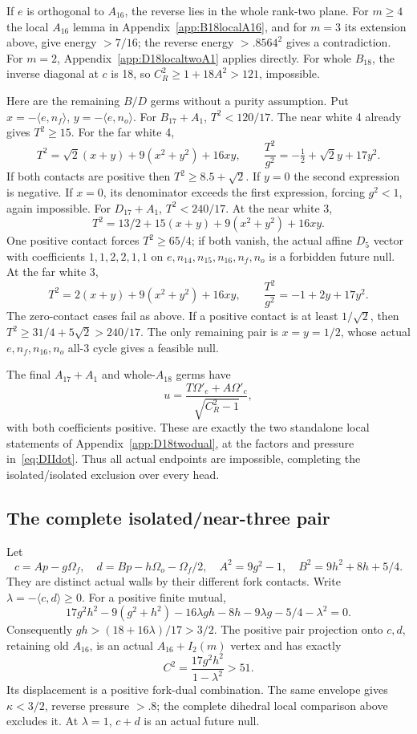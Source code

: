 \documentclass[11pt]{article}
\theoremstyle{definition}
\theoremstyle{remark}
\newcommand{\ip}[2]{\langle #1,#2\rangle}
\begin{document}
If \(e\) is orthogonal to \(A_{16}\), the reverse lies in the whole
rank-two plane.  For \(m\ge4\) the local \(A_{16}\) lemma in
Appendix~\ref{app:B18localA16}, and for \(m=3\) its extension
above, give energy \(>7/16\); the reverse energy
\(>.8564^2\) gives a contradiction.
For \(m=2\), Appendix~\ref{app:D18localtwoA1} applies directly.
For whole \(B_{18}\), the inverse diagonal at \(c\) is 18, so
\(C_R^2\ge1+18A^2>121\), impossible.

Here are the remaining \(B/D\) germs without a purity assumption.
Put \(x=-\ip e{n_f}\), \(y=-\ip e{n_o}\).
For \(B_{17}+A_1\), \(T^2<120/17\).
The near white 4 already gives \(T^2\ge15\).
For the far white 4,
\[
 T^2=\sqrt2(x+y)+9(x^2+y^2)+16xy,\qquad
 {\frac{T^2}{ g^2}}=-\tfrac12+\sqrt2y+17y^2 .
\]
If both contacts are positive then \(T^2\ge8.5+\sqrt2\).
If \(y=0\) the second expression is negative.
If \(x=0\), its denominator exceeds the first expression, forcing
\(g^2<1\), again impossible.
For \(D_{17}+A_1\), \(T^2<240/17\).
At the near white 3,
\[
 T^2=13/2+15(x+y)+9(x^2+y^2)+16xy .
\]
One positive contact forces \(T^2\ge65/4\); if both vanish,
the actual affine \(D_5\) vector with coefficients \(1,1,2,2,1,1\)
on \(e,n_{14},n_{15},n_{16},n_f,n_o\) is a forbidden future null.
At the far white 3,
\[
 T^2=2(x+y)+9(x^2+y^2)+16xy,\qquad
 {\frac{T^2}{ g^2}}=-1+2y+17y^2 .
\]
The zero-contact cases fail as above.
If a positive contact is at least \(1/\sqrt2\), then
\(T^2\ge31/4+5\sqrt2>240/17\).
The only remaining pair is \(x=y=1/2\), whose actual
\(e,n_f,n_{16},n_o\) all-3 cycle gives a feasible null.

The final \(A_{17}+A_1\) and whole-\(A_{18}\) germs have
\[
 u={\frac{T\Omega'_e+A\Omega'_c}{\sqrt{C_R^2-1}}},
\]
with both coefficients positive.
These are exactly the two standalone local statements of
Appendix~\ref{app:D18twodual}, at the factors and pressure
in~\eqref{eq:DIIdot}.
Thus all actual endpoints are impossible, completing the
isolated/isolated exclusion over every head.

\subsection{The complete isolated/near-three pair}
\label{app:D18isolatednear}

Let
\[
 c=Ap-g\Omega_f,\quad
 d=Bp-h\Omega_o-\Omega_f/2,\quad
 A^2=9g^2-1,\quad B^2=9h^2+8h+5/4 .
\]
They are distinct actual walls by their different fork contacts.
Write \(\lambda=-\ip cd\ge0\).
For a positive finite mutual,
\[
 17g^2h^2-9(g^2+h^2)-16\lambda gh
       -8h-9\lambda g-5/4-\lambda^2=0.
\]
Consequently \(gh>(18+16\lambda)/17>3/2\).
The positive pair projection onto \(c,d\), retaining old \(A_{16}\),
is an actual \(A_{16}+I_2(m)\) vertex and has exactly
\[
                  C^2={\frac{17g^2h^2}{1-\lambda^2}}>51.
\]
Its displacement is a positive fork-dual combination.
The same envelope gives \(\kappa<3/2\), reverse pressure \(>.8\);
the complete dihedral local comparison above excludes it.
At \(\lambda=1\), \(c+d\) is an actual future null.
\end{document}

